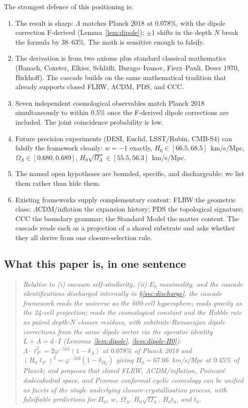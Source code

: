 \documentclass[11pt]{article}
\theoremstyle{plain}
\theoremstyle{definition}
\theoremstyle{remark}
\begin{document}
The strongest defence of this positioning is:
\begin{enumerate}[leftmargin=2em]
\item The result is sharp: $\Lambda$ matches Planck 2018 at $0.078\%$, with the dipole correction F-derived (Lemma~\ref{lem:dipole}); $\pm 1$ shifts in the depth $N$ break the formula by $38$--$63\%$. The math is sensitive enough to falsify.
\item The derivation is from two axioms plus standard classical mathematics (Banach, Coxeter, Elkies, Schl\"afli, Burago--Ivanov, Fierz--Pauli, Deser 1970, Birkhoff). The cascade builds on the same mathematical tradition that already supports closed FLRW, ΛCDM, PDS, and CCC.
\item Seven independent cosmological observables match Planck 2018 simultaneously to within $0.5\%$ once the F-derived dipole corrections are included. The joint coincidence probability is low.
\item Future precision experiments (DESI, Euclid, LSST/Rubin, CMB-S4) can falsify the framework cleanly: $w = -1$ exactly, $H_0 \in [66.5, 68.5]$~km/s/Mpc, $\Omega_\Lambda \in [0.680, 0.689]$, $H_0 \sqrt{\Omega_\Lambda} \in [55.5, 56.3]$~km/s/Mpc.
\item The named open hypotheses are bounded, specific, and dischargeable; we list them rather than hide them.
\item Existing frameworks supply complementary content: FLRW the geometric class; $\Lambda$CDM/inflation the expansion history; PDS the topological signature; CCC the boundary grammar; the Standard Model the matter content. The cascade reads each as a projection of a shared substrate and asks whether they all derive from one closure-selection rule.
\end{enumerate}

\subsection{What this paper is, in one sentence}

\begin{quote}
\textit{Relative to (i) vacuum self-similarity, (ii) $E_8$ maximality, and the cascade identifications discharged internally in \S\ref{sec:discharge}, the cascade framework reads the universe as the 600-cell hypersphere; reads gravity as the 24-cell projection; reads the cosmological constant and the Hubble rate as paired depth-$N$ closure residues, with substrate-Ramanujan dipole corrections from the same dipole sector via the operator identity $L + A = d \cdot I$ (Lemmas~\ref{lem:dipole}, \ref{lem:dipole-H0}): $\Lambda \cdot \ell_P^2 = 2 \varphi^{-583}(1 - \delta_\Lambda)$ at $0.078\%$ of Planck 2018 and $(H_0 \ell_P)^2 = \varphi^{-583}(1 - \delta_{H_0})$ giving $H_0 = 67.66$~km/s/Mpc at $0.45\%$ of Planck; and proposes that closed FLRW, $\Lambda$CDM/inflation, Poincar\'e dodecahedral space, and Penrose conformal cyclic cosmology can be unified as facets of the single underlying closure-crystallisation process, with falsifiable predictions for $H_0$, $w$, $\Omega_\Lambda$, $H_0 \sqrt{\Omega_\Lambda}$, $H_0 t_0$, and $t_0$.}
\end{quote}
\end{document}
